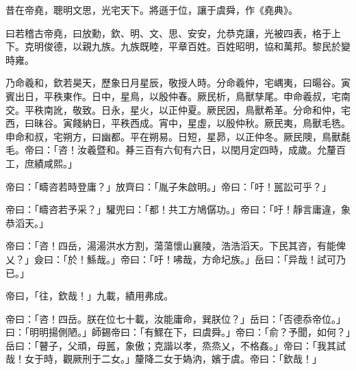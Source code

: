 
\begin{pinyinscope}
昔在帝堯，聰明文思，光宅天下。將遜于位，讓于虞舜，作《堯典》。

曰若稽古帝堯，曰放勳，欽、明、文、思、安安，允恭克讓，光被四表，格于上下。克明俊德，以親九族。九族既睦，平章百姓。百姓昭明，協和萬邦。黎民於變時雍。

乃命羲和，欽若昊天，歷象日月星辰，敬授人時。分命羲仲，宅嵎夷，曰暘谷。寅賓出日，平秩東作。日中，星鳥，以殷仲春。厥民析，鳥獸孳尾。申命羲叔，宅南交。平秩南訛，敬致。日永，星火，以正仲夏。厥民因，鳥獸希革。分命和仲，宅西，曰昧谷。寅餞納日，平秩西成。宵中，星虛，以殷仲秋。厥民夷，鳥獸毛毨。申命和叔，宅朔方，曰幽都。平在朔易。日短，星昴，以正仲冬。厥民隩，鳥獸氄毛。帝曰：「咨！汝羲暨和。朞三百有六旬有六日，以閏月定四時，成歲。允釐百工，庶績咸熙。」

帝曰：「疇咨若時登庸？」放齊曰：「胤子朱啟明。」帝曰：「吁！嚚訟可乎？」

帝曰：「疇咨若予采？」驩兜曰：「都！共工方鳩僝功。」帝曰：「吁！靜言庸違，象恭滔天。」

帝曰：「咨！四岳，湯湯洪水方割，蕩蕩懷山襄陵，浩浩滔天。下民其咨，有能俾乂？」僉曰：「於！鯀哉。」帝曰：「吁！咈哉，方命圮族。」岳曰：「异哉！試可乃已。」

帝曰，「往，欽哉！」九載，績用弗成。

帝曰：「咨！四岳。朕在位七十載，汝能庸命，巽朕位？」岳曰：「否德忝帝位。」曰：「明明揚側陋。」師錫帝曰：「有鰥在下，曰虞舜。」帝曰：「俞？予聞，如何？」岳曰：「瞽子，父頑，母嚚，象傲；克諧以孝，烝烝乂，不格姦。」帝曰：「我其試哉！女于時，觀厥刑于二女。」釐降二女于媯汭，嬪于虞。帝曰：「欽哉！」


\end{pinyinscope}